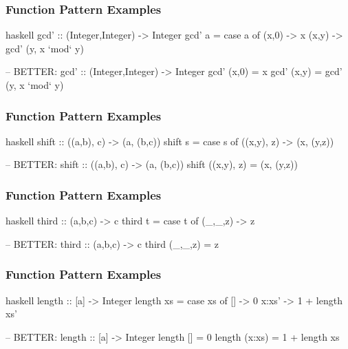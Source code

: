 \documentclass[dvipsnames]{beamer}
\theoremstyle{plain}
\begin{document}
\begin{frame}[fragile]
  \frametitle{Function Pattern Examples}

  \begin{exampleblock}{}
    \begin{pygments}{haskell}
gcd' :: (Integer,Integer) -> Integer
gcd' a =
    case a of
      (x,0) -> x
      (x,y) -> gcd' (y, x `mod` y)

-- BETTER:
gcd' :: (Integer,Integer) -> Integer
gcd' (x,0) = x
gcd' (x,y) = gcd' (y, x `mod` y)
    \end{pygments}
  \end{exampleblock}
\end{frame}

\begin{frame}[fragile]
  \frametitle{Function Pattern Examples}

  \begin{exampleblock}{}
    \begin{pygments}{haskell}
shift :: ((a,b), c) -> (a, (b,c))
shift s =
    case s of
      ((x,y), z) -> (x, (y,z))

-- BETTER:
shift :: ((a,b), c) -> (a, (b,c))
shift ((x,y), z) = (x, (y,z))
    \end{pygments}
  \end{exampleblock}
\end{frame}

\begin{frame}[fragile]
  \frametitle{Function Pattern Examples}

  \begin{exampleblock}{}
    \begin{pygments}{haskell}
third :: (a,b,c) -> c
third t =
    case t of
      (_,_,z) -> z

-- BETTER:
third :: (a,b,c) -> c
third (_,_,z) = z
    \end{pygments}
  \end{exampleblock}
\end{frame}

\begin{frame}[fragile]
  \frametitle{Function Pattern Examples}

  \begin{exampleblock}{}
    \begin{pygments}{haskell}
length :: [a] -> Integer
length xs =
    case xs of
      []    -> 0
      x:xs' -> 1 + length xs'

-- BETTER:
length :: [a] -> Integer
length []     = 0
length (x:xs) = 1 + length xs
    \end{pygments}
  \end{exampleblock}
\end{frame}
\end{document}
